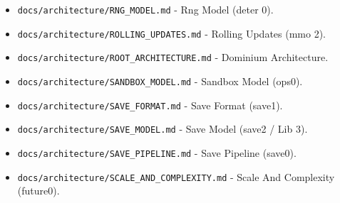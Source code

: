 \documentclass[9pt,a4paper,openany]{book}
\begin{document}
\begin{itemize}
\item \texttt{docs/\allowbreak{}architecture/\allowbreak{}RNG\_\allowbreak{}MODEL.\allowbreak{}md} -\allowbreak{} Rng Model (deter 0).\allowbreak{}
\end{itemize}

\begin{itemize}
\item \texttt{docs/\allowbreak{}architecture/\allowbreak{}ROLLING\_\allowbreak{}UPDATES.\allowbreak{}md} -\allowbreak{} Rolling Updates (mmo 2).\allowbreak{}
\end{itemize}

\begin{itemize}
\item \texttt{docs/\allowbreak{}architecture/\allowbreak{}ROOT\_\allowbreak{}ARCHITECTURE.\allowbreak{}md} -\allowbreak{} Dominium Architecture.\allowbreak{}
\end{itemize}

\begin{itemize}
\item \texttt{docs/\allowbreak{}architecture/\allowbreak{}SANDBOX\_\allowbreak{}MODEL.\allowbreak{}md} -\allowbreak{} Sandbox Model (ops0).\allowbreak{}
\end{itemize}

\begin{itemize}
\item \texttt{docs/\allowbreak{}architecture/\allowbreak{}SAVE\_\allowbreak{}FORMAT.\allowbreak{}md} -\allowbreak{} Save Format (save1).\allowbreak{}
\end{itemize}

\begin{itemize}
\item \texttt{docs/\allowbreak{}architecture/\allowbreak{}SAVE\_\allowbreak{}MODEL.\allowbreak{}md} -\allowbreak{} Save Model (save2 /\allowbreak{} Lib 3).\allowbreak{}
\end{itemize}

\begin{itemize}
\item \texttt{docs/\allowbreak{}architecture/\allowbreak{}SAVE\_\allowbreak{}PIPELINE.\allowbreak{}md} -\allowbreak{} Save Pipeline (save0).\allowbreak{}
\end{itemize}

\begin{itemize}
\item \texttt{docs/\allowbreak{}architecture/\allowbreak{}SCALE\_\allowbreak{}AND\_\allowbreak{}COMPLEXITY.\allowbreak{}md} -\allowbreak{} Scale And Complexity (future0).\allowbreak{}
\end{itemize}
\end{document}
